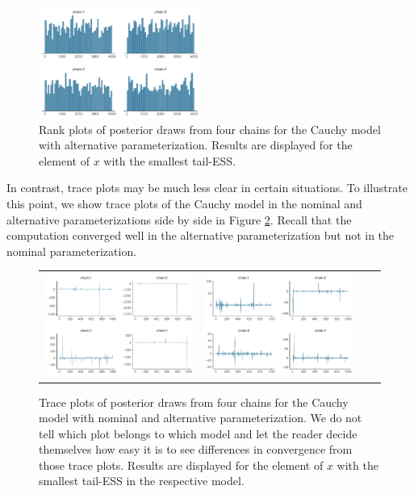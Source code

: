 \documentclass[american,]{article}
\theoremstyle{definition}
\begin{document}
\begin{figure}[tp]
  \centering
  \includegraphics[width=0.47\textwidth]{graphics/hist-fit-alt1-1.pdf}
  \caption{Rank plots of posterior draws from four chains for the Cauchy 
  model with alternative parameterization. Results are displayed for the
  element of $x$ with the smallest tail-ESS.}
  \label{fig:hist-fit-alt1-1}
\end{figure}

In contrast, trace plots may be much less clear in certain situations. To
illustrate this point, we show trace plots of the Cauchy model in the nominal 
and alternative parameterizations side by side in Figure \ref{fig:trace-cauchy}.
Recall that the computation converged well in the alternative parameterization
but not in the nominal parameterization.

\begin{figure}[htb]
\centering
  \begin{tabular}{@{}cccc@{}}
    \includegraphics[width=.49\textwidth]{graphics/trace-fit-alt1-1} &
    \includegraphics[width=.49\textwidth]{graphics/trace-fit-nom-1}
  \end{tabular}
  \caption{Trace plots of posterior draws from four chains for the Cauchy 
  model with nominal and alternative parameterization. We do not tell which plot belongs to which model and let the reader decide themselves how easy it is to see differences in convergence from those trace plots. Results are displayed for the
  element of $x$ with the smallest tail-ESS in the respective model.}
  \label{fig:trace-cauchy}
\end{figure}
\end{document}
